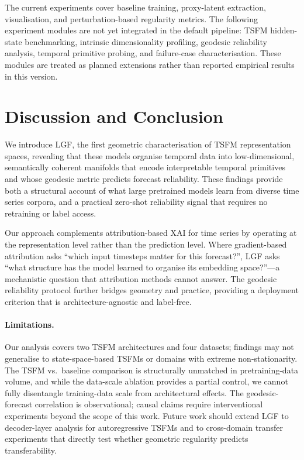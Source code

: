 \documentclass[letterpaper,twocolumn]{article}
\begin{document}
The current experiments cover baseline training, proxy-latent extraction,
visualisation, and perturbation-based regularity metrics.
The following experiment modules are not yet integrated in the default
pipeline: TSFM hidden-state benchmarking, intrinsic dimensionality profiling,
geodesic reliability analysis, temporal primitive probing, and failure-case
characterisation.
These modules are treated as planned extensions rather than reported empirical
results in this version.

\section{Discussion and Conclusion}
\label{sec:conclusion}

We introduce LGF, the first geometric characterisation of TSFM representation
spaces, revealing that these models organise temporal data into low-dimensional,
semantically coherent manifolds that encode interpretable temporal primitives
and whose geodesic metric predicts forecast reliability.
These findings provide both a structural account of what large pretrained models
learn from diverse time series corpora, and a practical zero-shot reliability
signal that requires no retraining or label access.

Our approach complements attribution-based XAI for time series
\citep{ismail2020benchmarking,theissler2022explainable} by operating at the
representation level rather than the prediction level.
Where gradient-based attribution asks ``which input timesteps matter for this
forecast?'', LGF asks ``what structure has the model learned to organise its
embedding space?''---a mechanistic question that attribution methods cannot answer.
The geodesic reliability protocol further bridges geometry and practice, providing
a deployment criterion that is architecture-agnostic and label-free.

\paragraph{Limitations.}
Our analysis covers two TSFM architectures and four datasets; findings may not
generalise to state-space-based TSFMs or domains with extreme non-stationarity.
The TSFM vs.\ baseline comparison is structurally unmatched in pretraining-data
volume, and while the data-scale ablation provides a partial control, we cannot
fully disentangle training-data scale from architectural effects.
The geodesic-forecast correlation is observational; causal claims require
interventional experiments beyond the scope of this work.
Future work should extend LGF to decoder-layer analysis for autoregressive TSFMs
and to cross-domain transfer experiments that directly test whether geometric
regularity predicts transferability.
\end{document}
